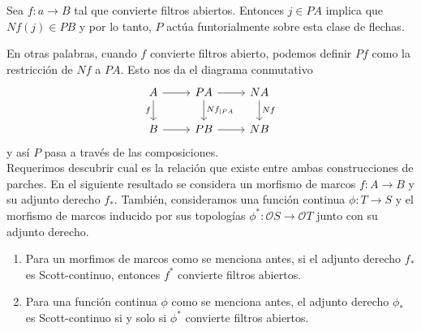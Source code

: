 \begin{lem}\label{Lema7.2.3}
    Sea $f\colon a\to B$ tal que convierte filtros abiertos. Entonces $j\in PA$ implica que $Nf(j)\in PB$ y por lo tanto, $P$ actúa funtorialmente sobre esta clase de flechas.
\end{lem}

En otras palabras, cuando $f$ convierte filtros abierto, podemos definir $Pf$ como la restricción de $Nf$ a $PA$. Esto nos da el diagrama conmutativo
\[\begin{tikzcd}
	A & PA & NA \\
	B & PB & NB
	\arrow[from=1-1, to=1-2]
	\arrow["f"', from=1-1, to=2-1]
	\arrow[from=1-2, to=1-3]
	\arrow["{Nf_{\mid PA}}", from=1-2, to=2-2]
	\arrow["Nf", from=1-3, to=2-3]
	\arrow[from=2-1, to=2-2]
	\arrow[from=2-2, to=2-3]
\end{tikzcd}\]
y así $P$ pasa a través de las composiciones.\\

Requerimos descubrir cual es la relación que existe entre ambas construcciones de parches. En el siguiente resultado se considera un morfismo de marcos $f\colon A\to B$ y su adjunto derecho $f_*$. También, consideramos una función continua $\phi\colon T\to S$ y el morfismo de marcos inducido por sus topologías $\phi^*\colon\mathcal{O}S\to \mathcal{O}T$ junto con su adjunto derecho.\\

\begin{thm}\label{Teorema7.2.4}
    \begin{enumerate}
        \item Para un morfimos de marcos como se menciona antes, si el adjunto derecho $f_*$ es Scott-continuo, entonces $f^*$ convierte filtros abiertos.
        \item Para una función continua $\phi$ como se menciona antes, el adjunto derecho $\phi_*$ es Scott-continuo si y solo si $\phi^*$ convierte filtros abiertos.
    \end{enumerate}
\end{thm}

